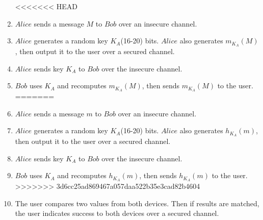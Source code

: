 \begin{enumerate}
<<<<<<< HEAD
\item $Alice$ sends a message $M$ to $Bob$ over an insecure channel. 
\item $Alice$ generates a random key $K_A$(16-20) bits. $Alice$ also generates $m_{K_A}(M)$, then output it to the user over a secured channel. 
\item $Alice$ sends key $K_A$ to $Bob$ over the insecure channel. 
\item $Bob$ uses $K_A$ and recomputes $m_{K_A}(M)$, then sends $m_{K_A}(M)$ to the user. 
=======
\item $Alice$ sends a message $m$ to $Bob$ over an insecure channel. 
\item $Alice$ generates a random key $K_A$(16-20) bits. $Alice$ also generates $h_{K_A}(m)$, then output it to the user over a secured channel. 
\item $Alice$ sends key $K_A$ to $Bob$ over the insecure channel. 
\item $Bob$ uses $K_A$ and recomputes $h_{K_A}(m)$, then sends $h_{K_A}(m)$ to the user. 
>>>>>>> 3d6cc25ad869467a057daa522b35e3cad82b4604
\item The user compares two values from both devices. Then if results are matched, the user indicates success to both devices over a secured channel. 
\end{enumerate}

